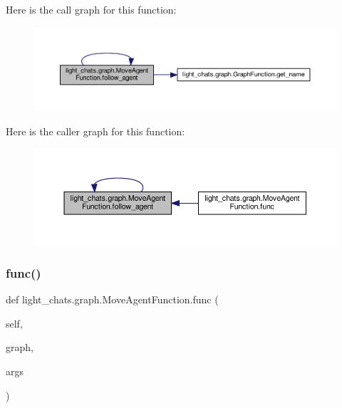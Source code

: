Here is the call graph for this function\+:
\nopagebreak
\begin{figure}[H]
\begin{center}
\leavevmode
\includegraphics[width=350pt]{classlight__chats_1_1graph_1_1MoveAgentFunction_adc15ccac3181a680d240e768a37b569e_cgraph}
\end{center}
\end{figure}
Here is the caller graph for this function\+:
\nopagebreak
\begin{figure}[H]
\begin{center}
\leavevmode
\includegraphics[width=350pt]{classlight__chats_1_1graph_1_1MoveAgentFunction_adc15ccac3181a680d240e768a37b569e_icgraph}
\end{center}
\end{figure}
\mbox{\label{classlight__chats_1_1graph_1_1MoveAgentFunction_a7ca8113d7746de96f740eaa61bda0c32}} 
\subsubsection{\texorpdfstring{func()}{func()}}
{\footnotesize\ttfamily def light\+\_\+chats.\+graph.\+Move\+Agent\+Function.\+func (\begin{DoxyParamCaption}\item[{}]{self,  }\item[{}]{graph,  }\item[{}]{args }\end{DoxyParamCaption})}

